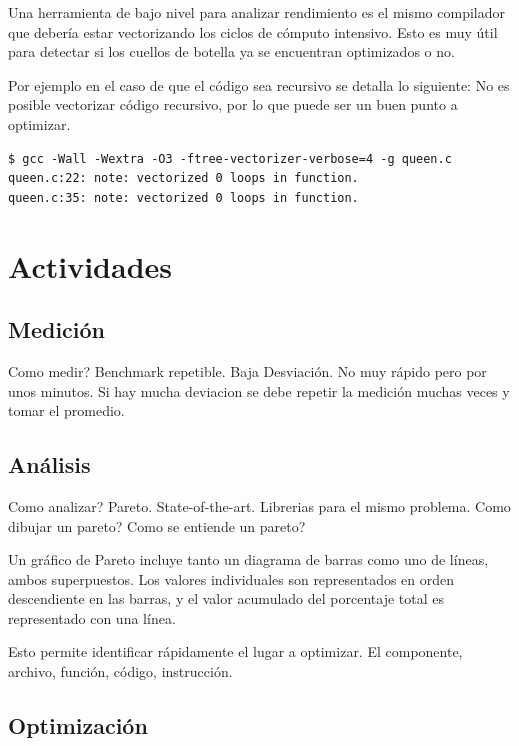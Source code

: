 \documentclass[a4paper]{report}
\begin{document}
Una herramienta de bajo nivel para analizar rendimiento es el mismo compilador
que deber\'ia estar vectorizando los ciclos de c\'omputo intensivo. Esto es muy
\'util para detectar si los cuellos de botella ya se encuentran optimizados o no.

\bigskip

Por ejemplo en el caso de que el c\'odigo sea recursivo se detalla lo siguiente:
No es posible vectorizar c\'odigo recursivo, por lo que puede ser un buen punto a
optimizar.

{\small
\begin{verbatim}
$ gcc -Wall -Wextra -O3 -ftree-vectorizer-verbose=4 -g queen.c
queen.c:22: note: vectorized 0 loops in function.
queen.c:35: note: vectorized 0 loops in function.
\end{verbatim}
}

\section{Actividades}

\subsection{Medici\'on}

Como medir? Benchmark repetible. Baja Desviaci\'on. No muy r\'apido pero por unos
minutos. Si hay mucha deviacion se debe repetir la medici\'on muchas veces y
tomar el promedio.

\subsection{An\'alisis}

Como analizar? Pareto. State-of-the-art. Librerias para el mismo problema.
Como dibujar un pareto? Como se entiende un pareto?

Un gr\'afico de Pareto incluye tanto un diagrama de barras como uno de l\'ineas, ambos superpuestos.
Los valores individuales son representados en orden descendiente en las barras, y el valor acumulado del porcentaje total es representado con una l\'inea.

Esto permite identificar r\'apidamente el lugar a optimizar. El componente, archivo, funci\'on, c\'odigo, instrucci\'on.

\subsection{Optimizaci\'on}
\end{document}
